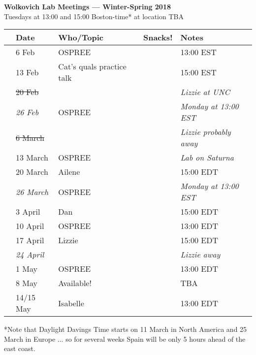 \documentclass[11pt]{article}
\begin{document}
 
\raggedright
{}

\begin{center} 
{\large \textbf{Wolkovich Lab Meetings --- Winter-Spring 2018}} \\ [2pt]
Tuesdays at 13:00 and 15:00 Boston-time* at location TBA \\
\end{center} 

\begin{center}
\begin{tabular}{ p{0.2 cm}  p{2 cm}  p{5 cm}  p{2 cm}  p{4 cm} }  \hline \hline
 & \textbf{Date}
   & \textbf{Who/Topic}
      & \textbf{Snacks!} 
         & \textbf{Notes} \\ 
\hline \hline
 & 6 Feb & OSPREE &       &  13:00 EST\\\hline
 & 13 Feb & Cat's quals practice talk &       &  15:00 EST\\\hline
 & \sout{20 Feb} & &       &  \emph{Lizzie at UNC} \\\hline
 & \emph{26 Feb} & OSPREE &       &  \emph{Monday at 13:00 EST}} \\\hline
 & \sout{6 March} & &       &  \emph{Lizzie probably away} \\\hline
 & 13 March & OSPREE &       &  \emph{Lab on Saturna} \\\hline
 & 20 March & Ailene &     &  15:00 EDT\\\hline
 & \emph{26 March} & OSPREE&       &  \emph{Monday at 13:00 EST}\\\hline
 & 3 April  & Dan &       &  15:00 EDT\\\hline
 & 10 April & OSPREE &       &  13:00 EDT\\\hline
 & 17 April & Lizzie &       &  15:00 EDT\\\hline
 & \emph{24 April} & &       &  \emph{Lizzie away}\\\hline
 & 1 May  & OSPREE &  & 13:00 EDT\\\hline  
 & 8 May  & Available! &  & TBA \\\hline  
 & 14/15 May  & Isabelle &  & 13:00 EDT \\\hline  

\hline
\end{tabular}
\end{center}
*Note that Daylight Davings Time starts on 11 March in North America and 25 March in Europe ... so for several weeks Spain will be only 5 hours ahead of the east coast.
\end{document}
